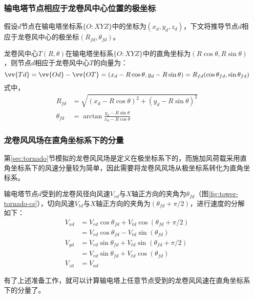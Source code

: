 \subsubsection{输电塔节点相应于龙卷风中心位置的极坐标}\label{sec:d-polor}
假设$d$节点在输电塔坐标系$\{O: XYZ\}$中的坐标为$(x_d, y_d, z_d)$，下文将推导节点$d$相应于龙卷风中心的极坐标$(R_{fd}, \theta_{fd})$。

龙卷风中心$T(R, \theta)$在输电塔坐标系$\{O: XYZ\}$中的直角坐标为$(R\cos\theta, R\sin\theta)$，则节点$d$相应于龙卷风中心$T$的向量为：
\begin{equation}
	\vv{Td} = \vv{Od} - \vv{OT} = (x_d - R\cos\theta, y_d - R\sin\theta) = R_{fd}(\cos\theta_{fd}, \sin\theta_{fd})
\end{equation}
式中，
\begin{equation}
	\begin{split}
		R_{fd} & = \sqrt{(x_d-R\cos\theta)^2+(y_d-R\sin\theta)^2} \\
		\theta_{fd} & = \arctan \frac{y_d - R\sin\theta}{x_d - R\cos\theta}
	\end{split}
\end{equation}

\subsubsection{龙卷风风场在直角坐标系下的分量}\label{sec:cs}
第\ref{sec:tornado}节模拟的龙卷风风场是定义在极坐标系下的，而施加风荷载采用直角坐标系下的风速分量较为简单，因此需要将龙卷风风场从极坐标系转化为直角坐标系。

输电塔节点$d$受到的龙卷风径向风速$V_{rd}$与$X$轴正方向的夹角为$\theta_{fd}$（图\ref{fig:tower-tornado-cs}），切向风速$V_{td}$与$X$轴正方向的夹角为$(\theta_{fd}+\pi/2)$，进行速度的分解如下：
\begin{equation}
	\begin{split}
		V_{xd} & = V_{rd} \cos\theta_{fd} + V_{td} \cos(\theta_{fd}+\pi/2) \\
		& = V_{rd} \cos\theta_{fd} - V_{td} \sin(\theta_{fd}) \\
		V_{yd} & = V_{rd} \sin\theta_{fd} + V_{td} \sin(\theta_{fd}+\pi/2) \\
		& = V_{rd} \sin\theta_{fd} + V_{td} \cos(\theta_{fd}) \\   
		V_{zd} & = V_{ad}  
	\end{split}
\end{equation}

有了上述准备工作，就可以计算输电塔上任意节点受到的龙卷风风速在直角坐标系下的分量了。

